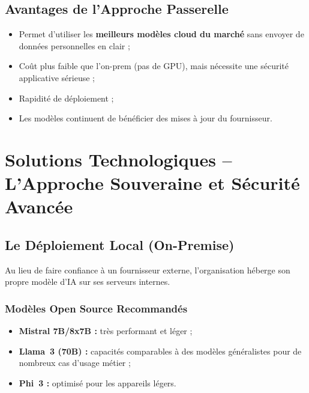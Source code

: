\documentclass[12pt, a4paper]{report}
\begin{document}
\subsection{Avantages de l'Approche Passerelle}

\begin{itemize}
  \item Permet d'utiliser les \textbf{meilleurs modèles cloud du marché}
        sans envoyer de données personnelles en clair ;
  \item Coût plus faible que l'on-prem (pas de GPU), mais nécessite une
        sécurité applicative sérieuse ;
  \item Rapidité de déploiement ;
  \item Les modèles continuent de bénéficier des mises à jour du
        fournisseur.
\end{itemize}

\newpage

\section{Solutions Technologiques -- L'Approche Souveraine et Sécurité
Avancée}

\subsection{Le Déploiement Local (On-Premise)}

Au lieu de faire confiance à un fournisseur externe, l'organisation
héberge son propre modèle d'IA sur ses serveurs internes.

\subsubsection{Modèles Open Source Recommandés}

\begin{itemize}
  \item \textbf{Mistral 7B/8x7B :} très performant et léger ;
  \item \textbf{Llama~3 (70B) :} capacités comparables à des modèles
        généralistes pour de nombreux cas d'usage métier ;
  \item \textbf{Phi~3 :} optimisé pour les appareils légers.
\end{itemize}
\end{document}
